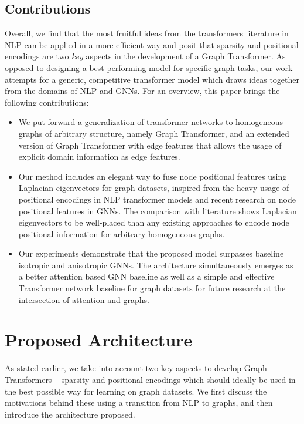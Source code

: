 \documentclass[letterpaper]{article}
\begin{document}
\subsection{Contributions}
Overall, we find that the most fruitful ideas from the transformers literature in NLP can be applied in a more efficient way and posit that sparsity and positional encodings are two \textit{key} aspects in the development of a Graph Transformer.
As opposed to designing a best performing model for specific graph tasks, our work attempts for a generic, competitive transformer model which draws ideas together from the domains of NLP and GNNs.
For an overview, this paper brings the following contributions:
\begin{itemize}
    \item We put forward a generalization of transformer networks to homogeneous graphs of arbitrary structure, namely Graph Transformer, and an extended version of Graph Transformer with edge features that allows the usage of explicit domain information as edge features.
    \item Our method includes an elegant way to fuse node positional features using Laplacian eigenvectors for graph datasets, inspired from the heavy usage of positional encodings in NLP transformer models and recent research on node positional features in GNNs.
    The comparison with literature shows Laplacian eigenvectors to be well-placed than any existing approaches to encode node positional information for arbitrary homogeneous graphs.
    \item Our experiments demonstrate that the proposed model surpasses baseline isotropic and anisotropic GNNs. The architecture simultaneously emerges as a better attention based GNN baseline as well as a simple and effective Transformer network baseline for graph datasets for future research at the intersection of attention and graphs.
\end{itemize}










\section{Proposed Architecture}
As stated earlier, we take into account two key aspects to develop Graph Transformers -- sparsity and positional encodings which should ideally be used in the best possible way for learning on graph datasets. We first discuss the motivations behind these using a transition from NLP to graphs, and then introduce the architecture proposed.
\end{document}
